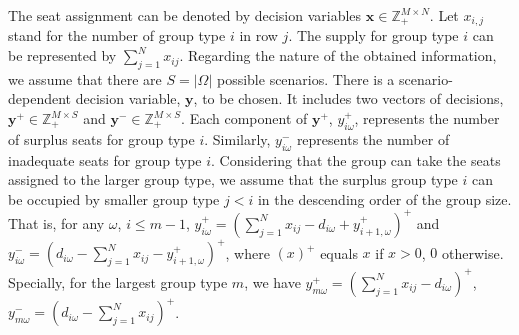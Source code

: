 The seat assignment can be denoted by decision variables $\mathbf{x}\in \mathbb{Z}_{+}^{M \times N}$. Let $x_{i,j}$ stand for the number of group type $i$ in row $j$. The supply for group type $i$ can be represented by $\sum_{j=1}^N x_{ij}$.
Regarding the nature of the obtained information, we assume that there are $S = |\Omega|$ possible scenarios. There is a scenario-dependent decision variable, $\mathbf{y}$, to be chosen. It includes two vectors of decisions, $\mathbf{y}^{+} \in \mathbb{Z}_{+}^{M \times S}$ and $\mathbf{y}^{-} \in \mathbb{Z}_{+}^{M \times S}$. Each component of $\mathbf{y}^{+}$, $y_{i \omega}^{+}$, represents the number of surplus seats for group type $i$. Similarly, $y_{i \omega}^{-}$ represents the number of inadequate seats for group type $i$.
Considering that the group can take the seats assigned to the larger group type, we assume that the surplus group type $i$ can be occupied by smaller group type $j<i$ in the descending order of the group size. That is, for any $\omega$, $i \leq m-1$, $y_{i \omega}^{+}=\left(\sum_{j=1}^N x_{ij}- d_{i \omega} + y_{i+1, \omega}^{+}\right)^{+}$ and $y_{i \omega}^{-}=\left(d_{i \omega}- \sum_{j=1}^N x_{ij} - y_{i+1, \omega}^{+} \right)^{+}$, where $(x)^{+}$ equals $x$ if $x>0$, $0$ otherwise. Specially, for the largest group type $m$, we have $y_{m \omega}^{+} = (\sum_{j=1}^N x_{ij} - d_{i \omega})^{+}$, $y_{m \omega}^{-} = (d_{i \omega}- \sum_{j=1}^N x_{ij})^{+}$.









